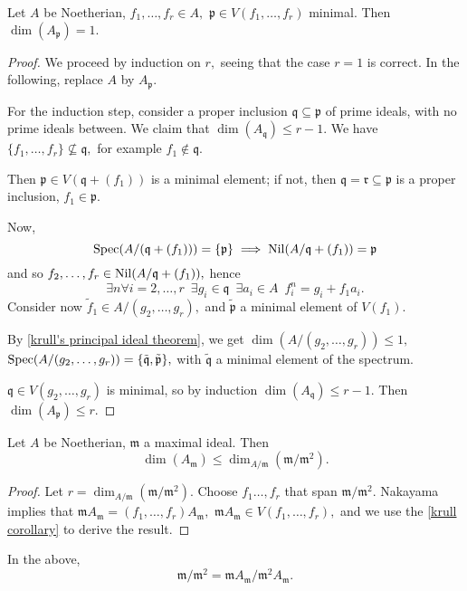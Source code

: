 \begin{corollary}
  \label{krull corollary}
  Let \(A\) be Noetherian,
  \(f_1, \dotsc, f_r \in A,\)
  \(\mathfrak p \in V(f_1, \dotsc, f_r)\) minimal.
  Then
  \(\dim(A_{\mathfrak p}) = 1.\)
\end{corollary}
\begin{proof}
  We proceed by induction on \(r,\) seeing that the case \(r=1\) is correct. In the following, replace \(A\) by \(A_{\mathfrak p}.\)

  For the induction step, consider a proper inclusion \(\mathfrak q \subseteq \mathfrak p\) of prime ideals, with no prime ideals between. We claim that \(\dim(A_{\mathfrak q}) \leq r-1.\)
  We have
  \(\{f_1, \dotsc, f_r\} \not\subseteq \mathfrak q,\)
  for example \(f_1 \notin \mathfrak q.\)

  Then \(\mathfrak p \in V(\mathfrak q + (f_1))\) is a  minimal element; if not, then \(\mathfrak q = \mathfrak r \subseteq \mathfrak p\) is a proper inclusion, \(f_1 \in \mathfrak p.\)

  Now,
  \[\text{Spec}(A/{(\mathfrak q + (f_1))}) = \{\mathfrak p\} \implies \operatorname{Nil}(A / {\mathfrak q + (f_1)}) = \mathfrak p\]
  and so \(f_2, \dotsc, f_r \in \operatorname{Nil}(A/{\mathfrak q + (f_1)}),\) hence
  \[\exists n \forall i = 2, \dotsc, r \enspace \exists g_i \in \mathfrak q \enspace \exists a_i \in A \enspace f_i^n = g_i + f_1 a_i.\]
  Consider now \(\tilde{f}_1 \in A/{(g_2, \dotsc, g_r)},\) and \(\tilde{\mathfrak p}\) a minimal element of \(V(f_1).\)

  By \cref{krull's principal ideal theorem}, we get
  \(\dim(A/{(g_2, \dotsc, g_r)}) \leq 1,\)
  \(\text{Spec}(A/{(g_2, \dotsc, g_r)}) = \{\tilde{\mathfrak q}, \tilde{\mathfrak p}\},\)
  with \(\tilde{\mathfrak q}\) a minimal element of the spectrum.

  \(\mathfrak q \in V(g_2, \dotsc, g_r)\) is minimal, so by induction \(\dim(A_{\mathfrak q}) \leq r - 1.\) Then \(\dim(A_{\mathfrak p}) \leq r.\)
\end{proof}

\begin{corollary}
  Let \(A\) be Noetherian, \(\mathfrak m\) a maximal ideal. Then
  \[\dim(A_{\mathfrak m}) \leq \dim_{A/{\mathfrak m}}(\mathfrak m /{\mathfrak m^2}).\]
\end{corollary}
\begin{proof}
  Let \(r = \dim_{A/{\mathfrak m}}(\mathfrak m /{\mathfrak m^2}).\) Choose \(f_1 \dotsc, f_r\) that span \(\mathfrak m /{\mathfrak m^2}\). Nakayama implies that
  \(\mathfrak m A_{\mathfrak m} = (f_1, \dotsc, f_r) A_{\mathfrak m},\)
  \(\mathfrak m A_{\mathfrak m} \in V(f_1, \dotsc, f_r),\)
  and we use the \cref{krull corollary} to derive the result.
\end{proof}

\begin{note}
  In the above,
  \[\mathfrak m /{\mathfrak m^2} = \mathfrak m A_{\mathfrak m} /{\mathfrak m^2 A_{\mathfrak m}}.\]
\end{note}









